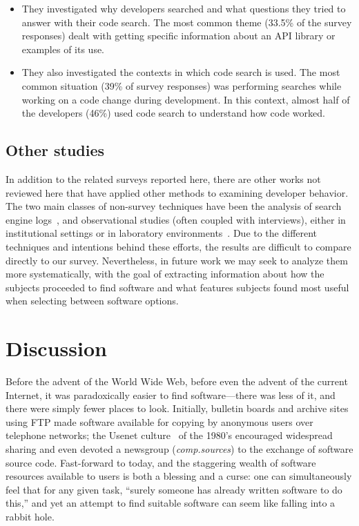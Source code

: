 \documentclass{casicswhitepaper}
\begin{document}
\begin{itemize}

\item They investigated why developers searched and what questions they tried to answer with their code search.  The most common theme (33.5\% of the survey responses) dealt with getting specific information about an API library or examples of its use.

\item They also investigated the contexts in which code search is used.  The most common situation (39\% of survey responses) was performing searches while working on a code change during development.  In this context, almost half of the developers (46\%) used code search to understand how code worked.

\end{itemize}


\subsection{Other studies}

In addition to the related surveys reported here, there are other works not reviewed here that have applied other methods to examining developer behavior.  The two main classes of non-survey techniques have been the analysis of search engine logs~\cite{bajrachary_2009, bajracharya2012analyzing, jansen_2006, teevan_2004, brandt2009two, brandt2010example, Li2009751, ge2014developers, volske2015users}, and observational studies (often coupled with interviews), either in institutional settings or in laboratory environments~\cite{sim_2011, brandt2009two, banker1993repository, gallardo2013software, sherif2003barriers, pohthong2001reuse, sim2013controlled, murphyhill2015how, sim2011getting, dabbish_2012}.  Due to the different techniques and intentions behind these efforts, the results are difficult to compare directly to our survey.  Nevertheless, in future work we may seek to analyze them more systematically, with the goal of extracting information about how the subjects proceeded to find software and what features subjects found most useful when selecting between software options.


\section{Discussion}
\label{discussion}

Before the advent of the World Wide Web, before even the advent of the current Internet, it was paradoxically easier to find software---there was less of it, and there were simply fewer places to look.  Initially, bulletin boards and archive sites using FTP made software available for copying by anonymous users over telephone networks; the Usenet culture~\cite{emerson1983usenet} of the 1980's encouraged widespread sharing and even devoted a newsgroup (\emph{comp.sources}) to the exchange of software source code.  Fast-forward to today, and the staggering wealth of software resources available to users is both a blessing and a curse: one can simultaneously feel that for any given task, ``surely someone has already written software to do this,'' and yet an attempt to find suitable software can seem like falling into a rabbit hole.
\end{document}
